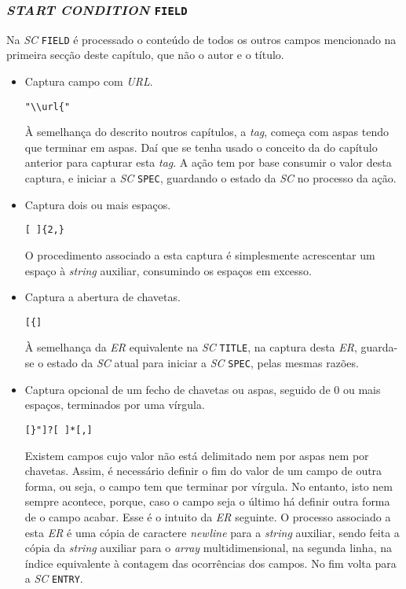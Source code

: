 \subsubsection{\emph{START CONDITION} \texttt{FIELD}}

Na \emph{SC} \texttt{FIELD} é processado o conteúdo de todos os outros campos
mencionado na primeira secção deste capítulo, que não o autor e o título.
\begin{itemize}
	\item Captura campo com \emph{URL}.  
\begin{verbatim}
"\\url{"
\end{verbatim}

À semelhança do descrito noutros capítulos, a \emph{tag}, começa com aspas tendo
que terminar em aspas. Daí que se tenha usado o conceito da do capítulo anterior
para capturar esta \emph{tag}. A ação tem por base consumir o valor desta
captura, e iniciar a \emph{SC} \texttt{SPEC}, guardando o estado da \emph{SC} no
processo da ação. 

\item Captura dois ou mais espaços.
\begin{verbatim}
[ ]{2,}
\end{verbatim}

O procedimento associado a esta captura é simplesmente acrescentar um espaço
à \emph{string} auxiliar, consumindo os espaços em excesso. 

\item Captura a abertura de chavetas.
\begin{verbatim}
[{]
\end{verbatim}

À semelhança da \emph{ER} equivalente na \emph{SC} \texttt{TITLE}, na captura
desta \emph{ER}, guarda-se o estado da \emph{SC} atual para iniciar
a \emph{SC} \texttt{SPEC}, pelas mesmas razões.     

\item Captura opcional de um fecho de chavetas ou aspas, seguido de 0 ou mais
	espaços, terminados por uma vírgula. 
\begin{verbatim}
[}"]?[ ]*[,]
\end{verbatim}

Existem campos cujo valor não está delimitado nem por aspas nem por chavetas.
Assim, é necessário definir o fim do valor de um campo de outra forma, ou seja,
o campo tem que terminar por vírgula. No entanto, isto nem sempre acontece,
porque, caso o campo seja o último há definir outra forma de o campo acabar.
Esse é o intuito da \emph{ER} seguinte. O processo associado a esta \emph{ER}
é uma cópia de caractere \emph{newline} para a \emph{string} auxiliar, sendo
feita a cópia da \emph{string} auxiliar para o \emph{array} multidimensional, na
segunda linha, na índice equivalente à contagem das ocorrências dos campos. No
fim volta para a \emph{SC} \texttt{ENTRY}.  


\end{itemize}
